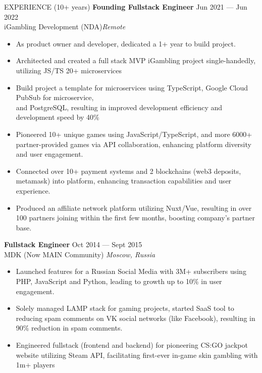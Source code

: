\documentclass{template} %
\begin{document}
\begin{rSection}{EXPERIENCE (10+ years)}
\textbf{Founding Fullstack Engineer} \hfill Jun 2021 --- Jun 2022\\
iGambling Development (NDA)\hfill \textit{Remote}
 \begin{itemize}
    \itemsep -3pt {} 
     \item As product owner and developer, dedicated a 1+ year to build project.
     \item Architected and created a full stack MVP iGambling project single-handedly, utilizing JS/TS 20+ microservices
     \item Build project a template for microservices using TypeScript, Google Cloud PubSub for microservice,\\and PostgreSQL, resulting in improved development efficiency and development speed by 40\%
     \item Pioneered 10+ unique games using JavaScript/TypeScript, and more 6000+ partner-provided games via API collaboration, enhancing platform diversity and user engagement.
     \item Connected over 10+ payment systems and 2 blockchains (web3 deposits, metamask) into platform, enhancing transaction capabilities and user experience.
     \item Produced an affiliate network platform utilizing Nuxt/Vue, resulting in over 100 partners joining within the first few months, boosting company's partner base.
 \end{itemize}
 \textbf{Fullstack Engineer} \hfill Oct 2014 --- Sept 2015\\
MDK (Now MAIN Community) \hfill \textit{Moscow, Russia}
 \begin{itemize}
    \itemsep -3pt {} 
     \item Launched features for a Russian Social Media with 3M+ subscribers using PHP, JavaScript and Python, leading to growth up to 10\% in user engagement.
     \item Solely managed LAMP stack for gaming projects, started SaaS tool to reducing spam comments on VK social networks (like Facebook), resulting in 90\% reduction in spam comments.
     \item Engineered fullstack (frontend and backend) for pioneering CS:GO jackpot website utilizing Steam API, facilitating first-ever in-game skin gambling with 1m+ players
 \end{itemize}

\end{rSection} 

\end{document}
